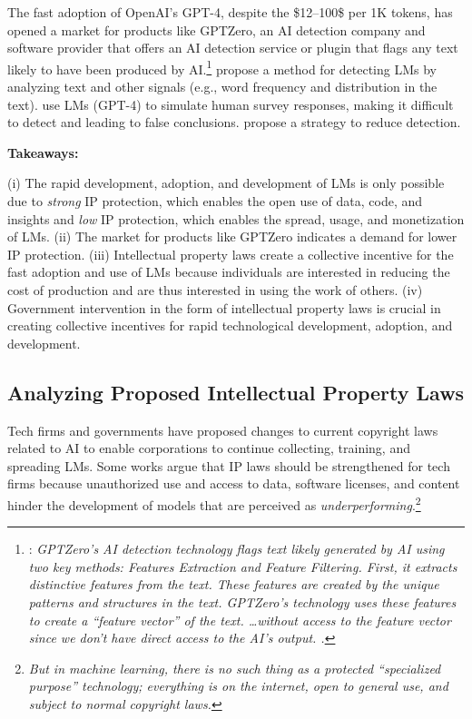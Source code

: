 \documentclass{article} %
\begin{document}
The fast adoption of OpenAI's GPT-4, despite the \$12--100\$ per 1K tokens, has opened a market for products like GPTZero, an AI detection company and software provider that offers an AI detection service or plugin that flags any text likely to have been produced by AI.\footnote{\citet{gptzero_technology}: \emph{GPTZero's AI detection technology flags text likely generated by AI using two key methods: Features Extraction and Feature Filtering. First, it \textit{extracts distinctive features from the text}. These features are created by the unique patterns and structures in the text. GPTZero's technology uses these features to create a ``feature vector'' of the text. \dots without access to the feature vector since we don't have direct access to the AI's output. .}}
\citet{hansspotting} propose a method for detecting LMs by analyzing text and other signals (e.g., word frequency and distribution in the text).
\citet{argyle2023out} use LMs (GPT-4) to simulate human survey responses, making it difficult to detect and leading to false conclusions.
\citet{wang2024economic} propose a strategy to reduce detection.

\textbf{Takeaways:}

    (i) The rapid development, adoption, and development of LMs is only possible due to \emph{strong} IP protection, which enables the open use of data, code, and insights and \emph{low} IP protection, which enables the spread, usage, and monetization of LMs.
    (ii) The market for products like GPTZero indicates a demand for lower IP protection.
    (iii) Intellectual property laws create a collective incentive for the fast adoption and use of LMs because individuals are interested in reducing the cost of production and are thus interested in using the work of others.
    (iv) Government intervention in the form of intellectual property laws is crucial in creating collective incentives for rapid technological development, adoption, and development.



\subsection{Analyzing Proposed Intellectual Property Laws}

Tech firms and governments have proposed changes to current copyright laws related to AI to enable corporations to continue collecting, training, and spreading LMs.
Some works argue that IP laws should be strengthened for tech firms because unauthorized use and access to data, software licenses, and content hinder the development of models that are perceived as \emph{underperforming}.\footnote{ \emph{But in machine learning, there is no such thing as a protected “specialized purpose” technology; everything is on the internet, open to general use, and subject to normal copyright laws.}}
\end{document}
